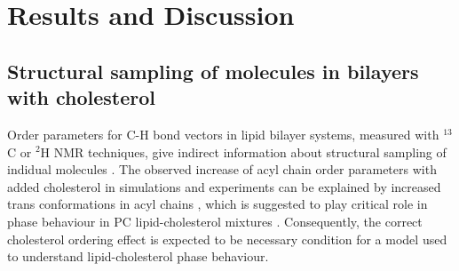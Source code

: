 \documentclass[aps,prl,superscriptaddress,twocolumn]{revtex4}
\begin{document}



\section{Results and Discussion}

\subsection{Structural sampling of molecules in bilayers with cholesterol}
Order parameters for C-H bond vectors in lipid bilayer systems, measured
with $^{13}$C or $^{2}$H NMR techniques, give indirect information about structural
sampling of indidual molecules \cite{ollila16}. The observed increase of
acyl chain order parameters with added cholesterol in simulations and
experiments can be explained by increased trans conformations in acyl chains \cite{ferreira13,??},
which is suggested to play critical role in phase behaviour in PC lipid-cholesterol
mixtures \cite{ipsen87}. Consequently, the correct cholesterol ordering effect is
expected to be necessary condition for a model used to understand lipid-cholesterol
phase behaviour.
\end{document}
